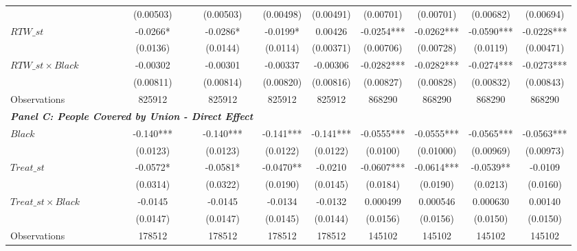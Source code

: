 \begin{table}[ht!]
\begin{tabular}{l*{8}{c}}
&   (0.00503)   &   (0.00503)   &   (0.00498)   &   (0.00491)   &   (0.00701)   &   (0.00701)   &   (0.00682)   &   (0.00694)   \\
[1em]
$ RTW\_{st} $      &     -0.0266*  &     -0.0286*  &     -0.0199*  &     0.00426   &     -0.0254***&     -0.0262***&     -0.0590***&     -0.0228***\\
&    (0.0136)   &    (0.0144)   &    (0.0114)   &   (0.00371)   &   (0.00706)   &   (0.00728)   &    (0.0119)   &   (0.00471)   \\
[1em]
$ RTW\_{st} \times Black $&    -0.00302   &    -0.00301   &    -0.00337   &    -0.00306   &     -0.0282***&     -0.0282***&     -0.0274***&     -0.0273***\\
&   (0.00811)   &   (0.00814)   &   (0.00820)   &   (0.00816)   &   (0.00827)   &   (0.00828)   &   (0.00832)   &   (0.00843)   \\
\hline
Observations        &      825912   &      825912   &      825912   &      825912   &      868290   &      868290   &      868290   &      868290   \\
\hline
\multicolumn{3}{l}{\linebreak \textbf{\textit{Panel C: People Covered by Union - Direct Effect}}} \\
$ Black $           &      -0.140***&      -0.140***&      -0.141***&      -0.141***&     -0.0555***&     -0.0555***&     -0.0565***&     -0.0563***\\
&    (0.0123)   &    (0.0123)   &    (0.0122)   &    (0.0122)   &    (0.0100)   &   (0.01000)   &   (0.00969)   &   (0.00973)   \\
[1em]
$ Treat\_{st} $      &     -0.0572*  &     -0.0581*  &     -0.0470** &     -0.0210   &     -0.0607***&     -0.0614***&     -0.0539** &     -0.0109   \\
&    (0.0314)   &    (0.0322)   &    (0.0190)   &    (0.0145)   &    (0.0184)   &    (0.0190)   &    (0.0213)   &    (0.0160)   \\
[1em]
$ Treat\_{st} \times Black $&     -0.0145   &     -0.0145   &     -0.0134   &     -0.0132   &    0.000499   &    0.000546   &    0.000630   &     0.00140   \\
&    (0.0147)   &    (0.0147)   &    (0.0145)   &    (0.0144)   &    (0.0156)   &    (0.0156)   &    (0.0150)   &    (0.0150)   \\
\hline
Observations        &      178512   &      178512   &      178512   &      178512   &      145102   &      145102   &      145102   &      145102   \\

\end{tabular}
\end{table}
